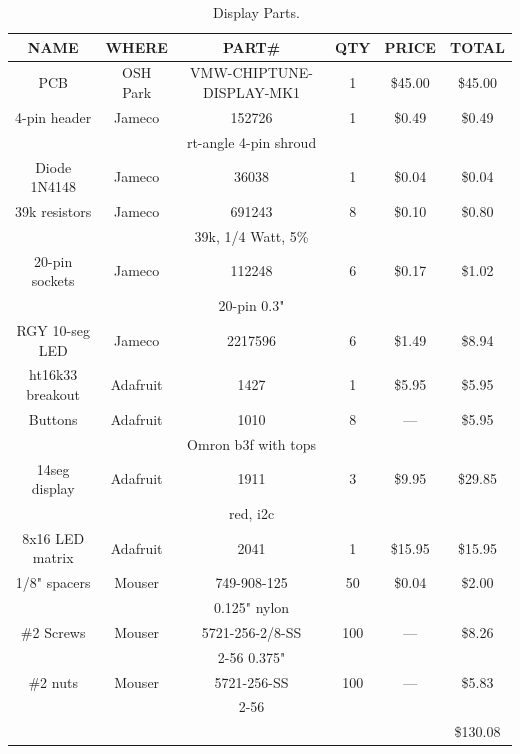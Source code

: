 \documentclass[11pt]{article}
\begin{document}
\begin{table}[tbp]

\caption{Display Parts.~\label{table:display_parts}}
\centering
\sf
\begin{tabular}{|c|c|c|c|c|c|}
\hline
NAME		& WHERE		& PART\#	           & QTY & PRICE    & TOTAL \\
\hline
\hline
PCB		& OSH Park	& VMW-CHIPTUNE-DISPLAY-MK1 & 1	 & \$45.00  & \$45.00 \\
\hline
4-pin header	& Jameco	& 152726                   & 1	 & \$0.49   &  \$0.49 \\
		&		& rt-angle 4-pin shroud	   &	 &          &         \\
\hline
Diode 1N4148	& Jameco	& 36038		           & 1	 & \$0.04   &  \$0.04 \\
\hline
39k resistors	& Jameco	& 691243		   & 8   &  \$0.10  &  \$0.80 \\
		&		& 39k, 1/4 Watt, 5\%	   &     &          &         \\
\hline
20-pin sockets	& Jameco	& 112248		   & 6	 &  \$0.17  &  \$1.02 \\
		&		& 20-pin 0.3"		   &     &          &         \\
\hline
RGY 10-seg LED	& Jameco	& 2217596		   & 6	 &  \$1.49  &  \$8.94 \\
\hline
ht16k33 breakout	& Adafruit	& 1427		           & 1	 & \$5.95   &  \$5.95 \\
\hline
Buttons		& Adafruit	& 1010			   & 8	 & ---	    &  \$5.95 \\
		&		& Omron b3f with tops	   &     &          &         \\
\hline
14seg display	& Adafruit	& 1911			   & 3	 & \$9.95   & \$29.85 \\
		&		& red, i2c		   &	 &          &	      \\  
\hline
8x16 LED matrix	& Adafruit	& 2041			   & 1	 & \$15.95  & \$15.95 \\
\hline

1/8" spacers	& Mouser	& 749-908-125		   & 50  & \$0.04   & \$2.00  \\
		& 		& 0.125" nylon		   &     &          &         \\
\hline
\#2 Screws	& Mouser	& 5721-256-2/8-SS	   & 100 & --- 	    & \$8.26  \\
		&		& 2-56 0.375"		   &     &          &         \\
\hline
\#2 nuts	& Mouser	& 5721-256-SS	   	   & 100 & --- 	    & \$5.83  \\
		&		& 2-56		   	   &     &          &         \\
\hline
\hline
		&		&		&	&		& \$130.08 \\
\hline
\end{tabular}
\end{table}
\end{document}
